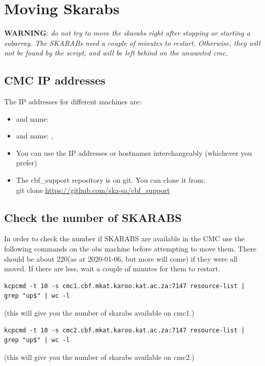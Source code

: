 


\section{Moving Skarabs}


\textbf{WARNING}:\textit{ do not try to move the skarabs right after stopping or starting a subarray. The SKARABs need a couple of minutes to restart. Otherwise, they will not be found by the script, and will be left behind on the unwanted cmc.}\\

\subsection{CMC IP addresses}
The IP addresses for different machines are:
\begin{itemize}


	\item[]  and name: 
\item[]  and name: , 

\item[] You can use the IP addresses or hostnames interchangeably (whichever you prefer) 


\item[] The cbf\_support repository is on git. You can clone it from:\\
git clone \url{https://github.com/ska-sa/cbf_support}
\end{itemize}
\subsection{Check the number of SKARABS}
In order to check the number if SKARABS are available in the CMC use the following
commands on the obs machine before attempting to move them. There should be about 220(as at 2020-01-06, but more will come) if they were all moved. If there are less, wait a couple
of minutes for them to restart.

\begin{lstlisting}[style=DOS]
kcpcmd -t 10 -s cmc1.cbf.mkat.karoo.kat.ac.za:7147 resource-list | grep "up$" | wc -l
\end{lstlisting}
(this will give you the number of skarabs available on cmc1.) 
\begin{lstlisting}[style=DOS]
kcpcmd -t 10 -s cmc2.cbf.mkat.karoo.kat.ac.za:7147 resource-list | grep "up$" | wc -l
\end{lstlisting}
(this will give you the number of skarabs available on cmc2.) \\


